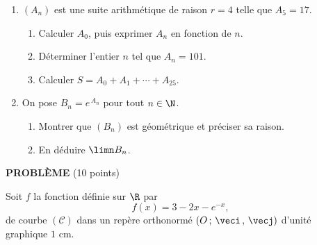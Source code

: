 \begin{devoirsurveille}
\begin{enumerate}[label=\textbf{\arabic*.}, leftmargin=*, itemsep=0.25em]
  \item $\left(A_{n}\right)$ est une suite arithmétique de raison $r = 4$
        telle que $A_{5} = 17$.
    \begin{enumerate}[label=\textbf{\alph*)}, leftmargin=1.4em, itemsep=0.15em]
      \item Calculer $A_{0}$, puis exprimer $A_{n}$ en fonction de $n$.
      \item Déterminer l'entier $n$ tel que $A_{n} = 101$. 
      \item Calculer $S = A_{0}+A_{1}+\cdots+A_{25}$. 
    \end{enumerate}
  \item On pose $B_{n} = e^{\,A_{n}}$ pour tout $n \in \N$.
    \begin{enumerate}[label=\textbf{\alph*)}, leftmargin=1.4em, itemsep=0.15em]
      \item Montrer que $\left(B_{n}\right)$ est géométrique et préciser sa
            raison. 
      \item En déduire $\limn B_{n}$. 
    \end{enumerate}
\end{enumerate}

\vspace{0.7em}
\noindent\textbf{\sffamily PROBLÈME} \hfill \textup{(10 points)}

Soit $f$ la fonction définie sur $\R$ par
\[
  f(x) = 3-2x-e^{-x},
\]
de courbe $(\mathcal C)$ dans un repère orthonormé
$\left(O\,;\,\veci\,,\,\vecj\right)$ d'unité graphique $1$ cm.


\end{devoirsurveille}
